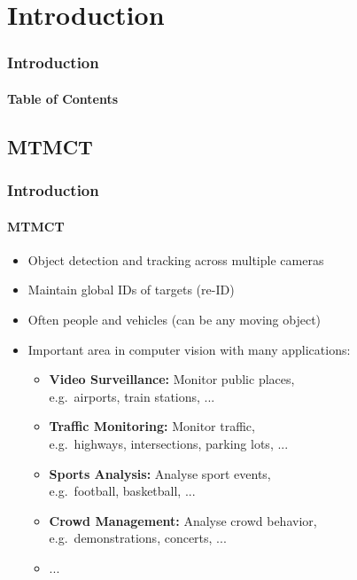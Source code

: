 \section{Introduction}
\begin{frame}
    \frametitle{Introduction}
    \framesubtitle{Table of Contents}
    {
        \hypersetup{hidelinks}
    }
\end{frame}

\subsection{MTMCT}
\begin{frame}
    \frametitle{Introduction}
    \framesubtitle{MTMCT}

    \begin{itemize}
        \item<1-> Object detection and tracking across multiple cameras
              \vspace{5pt}
        \item<2-> Maintain global IDs of targets (re-ID)
              \vspace{5pt}
        \item<3-> Often people and vehicles (can be any moving object)
              \vspace{5pt}
        \item<4-> Important area in computer vision with many applications:
              \begin{itemize}
                  \item<4-> \textbf{Video Surveillance:} Monitor public places,\\e.g.~airports, train stations, ...
                  \item<5-> \textbf{Traffic Monitoring:} Monitor traffic,\\e.g.~highways, intersections, parking lots, ...
                  \item<6-> \textbf{Sports Analysis:} Analyse sport events,\\e.g.~football, basketball, ...
                  \item<7-> \textbf{Crowd Management:} Analyse crowd behavior,\\e.g.~demonstrations, concerts, ...
                  \item<7-> ...
              \end{itemize}
    \end{itemize}
\end{frame}

